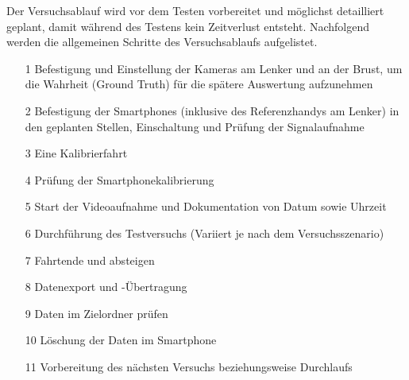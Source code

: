 Der Versuchsablauf wird vor dem Testen vorbereitet und möglichst detailliert geplant, damit während des Testens kein Zeitverlust entsteht.
Nachfolgend werden die allgemeinen Schritte des Versuchsablaufs aufgelistet.

\begin{itemize}
	\item[1] Befestigung und Einstellung der Kameras am Lenker und an der Brust, um die Wahrheit (Ground Truth) für die spätere Auswertung aufzunehmen
	\item[2] Befestigung der Smartphones (inklusive des Referenzhandys am Lenker) in den geplanten Stellen, Einschaltung und Prüfung der Signalaufnahme
	\item[3] Eine Kalibrierfahrt
	\item[4] Prüfung der Smartphonekalibrierung
	\item[5] Start der Videoaufnahme und Dokumentation von Datum sowie Uhrzeit
	\item[6] Durchführung des Testversuchs (Variiert je nach dem Versuchsszenario)
	\item[7] Fahrtende und absteigen
	\item[8] Datenexport und -Übertragung
	\item[9] Daten im Zielordner prüfen
	\item[10] Löschung der Daten im Smartphone
	\item[11] Vorbereitung des nächsten Versuchs beziehungsweise Durchlaufs
\end{itemize}

